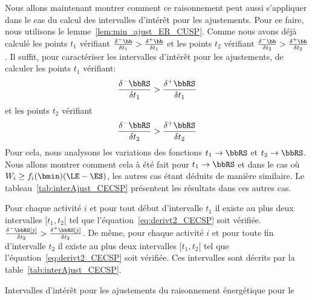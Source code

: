 Nous allons maintenant montrer comment ce raisonnement peut aussi
s'appliquer dans le cas du calcul des intervalles d'intérêt pour les
ajustements. Pour ce faire, nous utilisons le
lemme~\ref{lem:min_ajust_ER_CUSP}. Comme nous avons déjà calculé les
points $t_1$ vérifiant $\frac{\delta^{-}\bb}{\delta
t_1}>\frac{\delta^{+}\bb}{\delta t_1}$ et les points $t_2$ vérifiant
$\frac{\delta^{-}\bb}{\delta t_2} >\frac{\delta^{+}\bb}{\delta
t_2}$. Il suffit, pour caractériser les intervalles d'intérêt pour les
ajustements, de calculer les points $t_1$ vérifiant:
\begin{equation}
\frac{\delta^{-}\bbRS}{\delta t_1} >\frac{\delta^{+}\bbRS}{\delta
t_1}\label{eq:derivt1_CECSP} \end{equation}
et les points $t_2$ vérifiant \begin{equation}
\frac{\delta^{-}\bbRS}{\delta t_2} > \frac{\delta^{+}\bbRS}{\delta
t_2}\label{eq:derivt2_CECSP}\end{equation}
Pour cela, nous analysons les variations des fonctions $t_1
\rightarrow \bbRS$ et $t_2 \rightarrow \bbRS$. Nous allons montrer
comment cela à été fait pour $t_1 \rightarrow \bbRS$ et dans le cas où
$W_i \ge f_i(\bmin) (\LE - \ES)$, les autres cas étant déduits de
manière similaire. Le tableau~\ref{tab:interAjust_CECSP} présentent
les résultats dans ces autres cas. 


\begin{theo}
  Pour chaque activité $i$ et pour tout début d'intervalle $t_1$ il
  existe au plus deux intervalles $[t_1,t_2[$ tel que
  l'équation~\eqref{eq:derivt2_CECSP} soit vérifiée.
  $\frac{\delta^{-}\bbRS[j]}{\delta t_2} >
  \frac{\delta^{+}\bbRS[j]}{\delta t_2} $. 
  De même,  pour chaque activité $i$ et pour toute fin d'intervalle $t_2$ il
  existe au plus deux intervalles $[t_1,t_2[$ tel que
  l'équation~\eqref{eq:derivt2_CECSP} soit vérifiée. 
  Ces intervalles sont décrits
  par la table~\ref{tab:interAjust_CECSP}.
  \begin{table} 
  
  \caption{Intervalles d'intérêt pour les ajustements du
    raisonnement énergétique pour le \CECSP}
  \label{tab:interAjust_CECSP}
\end{table}
\end{theo}

